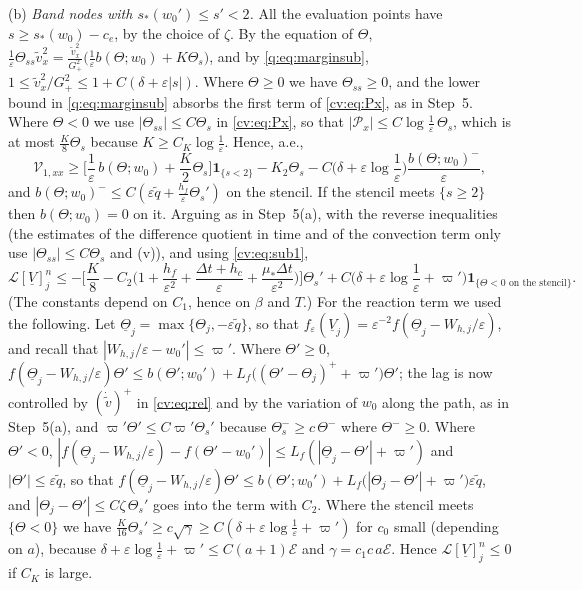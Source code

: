 \documentclass[11pt]{amsart}
\theoremstyle{definition}
\theoremstyle{remark}
\newcommand{\ve}{\varepsilon}
\newcommand{\Lop}{\mathcal{L}}
\begin{document}
(b) \emph{Band nodes with $s_*(w_0')\le s'<2$.} All the evaluation points have
$s\ge s_*(w_0)-c_e$, by the choice of $\zeta$. By the equation of $\Theta$,
$\frac1\ve\Theta_{ss}\tilde v_x^2=\frac{\tilde v_x^2}{G_+^2}\big(\frac1\ve b(\Theta;w_0)+K\Theta_s\big)$, and by
\eqref{q:eq:marginsub}, $1\le\tilde v_x^2/G_+^2\le1+C(\delta+\ve|s|)$. Where $\Theta\ge0$ we have $\Theta_{ss}\ge0$,
and the lower bound in \eqref{q:eq:marginsub} absorbs the first term of \eqref{cv:eq:Px}, as
in Step~5. Where $\Theta<0$ we use $|\Theta_{ss}|\le C\Theta_s$ in \eqref{cv:eq:Px}, so that
$|\mathcal P_x|\le C\log\frac1\ve\,\Theta_s$, which is at most $\frac K8\Theta_s$ because $K\ge C_K\log\frac1\ve$. Hence, a.e.,
\[
\mathcal V_{1,xx}\ge\Big[\frac1\ve\,b(\Theta;w_0)+\frac K2\Theta_s\Big]\mathbf 1_{\{s<2\}}-K_2\Theta_s
-C\Big(\delta+\ve\log\frac1\ve\Big)\frac{b(\Theta;w_0)^-}\ve ,
\]
and $b(\Theta;w_0)^-\le C(\ve\tilde q+\frac{h_f}\ve\Theta_s')$ on the stencil. If the stencil meets $\{s\ge2\}$ then
$b(\Theta;w_0)=0$ on it. Arguing as in Step~5(a), with the reverse inequalities (the
estimates of the difference quotient in time and of the convection term only use
$|\Theta_{ss}|\le C\Theta_s$ and (v)), and using \eqref{cv:eq:sub1},
\[
\Lop[\underline V]^n_j\le-\Big[\frac K8-C_2\Big(1+\frac{h_f}{\ve^2}+\frac{\Delta t+h_c}\ve+\frac{\mu_*\Delta t}{\ve^2}\Big)\Big]\Theta_s'
+C\Big(\delta+\ve\log\frac1\ve+\varpi'\Big)\mathbf 1_{\{\Theta<0\text{ on the stencil}\}} .
\]
(The constants depend on $C_1$, hence on $\beta$ and $T$.) For the reaction term we used
the following. Let $\underline\Theta_j=\max\{\Theta_j,-\ve\tilde q\}$, so that
$f_\ve(\underline V_j)=\ve^{-2}f(\underline\Theta_j-W_{h,j}/\ve)$, and recall that
$|W_{h,j}/\ve-w_0'|\le\varpi'$. Where $\Theta'\ge0$,
$f(\underline\Theta_j-W_{h,j}/\ve)\Theta'\le b(\Theta';w_0')+L_f\big((\Theta'-\Theta_j)^++\varpi'\big)\Theta'$; the lag is
now controlled by
$(\dot{\tilde v})^+$ in \eqref{cv:eq:rel} and by the variation of $w_0$ along the path, as in
Step~5(a), and $\varpi'\Theta'\le C\varpi'\Theta_s'$ because $\Theta^-_s\ge c\,\Theta^-$ where $\Theta^-\ge0$. Where
$\Theta'<0$, $|f(\underline\Theta_j-W_{h,j}/\ve)-f(\Theta'-w_0')|\le L_f(|\underline\Theta_j-\Theta'|+\varpi')$ and
$|\Theta'|\le\ve\tilde q$, so that
$f(\underline\Theta_j-W_{h,j}/\ve)\Theta'\le b(\Theta';w_0')+L_f\big(|\Theta_j-\Theta'|+\varpi'\big)\ve\tilde q$, and
$|\Theta_j-\Theta'|\le C\zeta\,\Theta_s'$ goes into the term with $C_2$. Where the stencil meets
$\{\Theta<0\}$ we have $\frac K{16}\Theta_s'\ge c\sqrt\gamma\ge C(\delta+\ve\log\frac1\ve+\varpi')$ for $c_0$ small
(depending on $a$), because
$\delta+\ve\log\frac1\ve+\varpi'\le C(a+1)\mathcal E$ and $\gamma=c_1c\,a\mathcal E$. Hence $\Lop[\underline V]^n_j\le0$ if $C_K$ is large.
\end{document}
